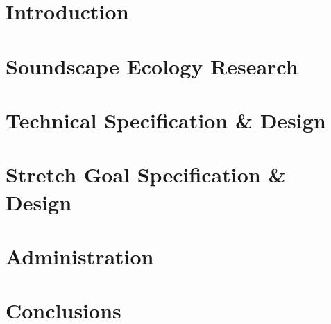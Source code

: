 \documentclass[12pt, twoside]{article}
\begin{document}
  
  \pagestyle{empty}                                     %
  \tableofcontents
  \newpage


  \pagestyle{plain} %
  \setcounter{page}{1}

  \section{Introduction}
  
  
  
  
  \newpage

  \section{Soundscape Ecology Research}
  
  
  
  \newpage

  \section{Technical Specification \& Design}
  
  
  
  
  
  
  
  
  
  
  
  
  
  
  
  
  
  \newpage

  \section{Stretch Goal Specification \& Design}
  
  
  \newpage

  \section{Administration}
  
  
  
  \newpage

  \section{Conclusions}
  
  
  
  \newpage

  \thispagestyle{empty}
  \printbibliography
\end{document}
